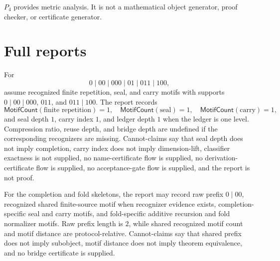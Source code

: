 \begin{corollary}
\label{cor:metric-report-p4-analysis-layer}
$P_4$ provides metric analysis. It is not a mathematical object generator, proof checker, or certificate generator.
\end{corollary}

\section{Full reports}
\label{sec:metric-report-full-reports}

\begin{example}
\label{ex:metric-report-full-completion}
For
$$
  0\mid 00\mid 000\mid 01\mid 011\mid 100,
$$
assume recognized finite repetition, seal, and carry motifs with supports $0\mid 00\mid 000$, $011$, and $011\mid 100$. The report records
$$
  \mathsf{MotifCount}(\text{finite repetition})=1,\quad
  \mathsf{MotifCount}(\text{seal})=1,\quad
  \mathsf{MotifCount}(\text{carry})=1,
$$
and seal depth $1$, carry index $1$, and ledger depth $1$ when the ledger is one level. Compression ratio, reuse depth, and bridge depth are undefined if the corresponding recognizers are missing. Cannot-claims say that seal depth does not imply completion, carry index does not imply dimension-lift, classifier exactness is not supplied, no name-certificate flow is supplied, no derivation-certificate flow is supplied, no acceptance-gate flow is supplied, and the report is not proof.
\end{example}

\begin{example}
\label{ex:metric-report-full-comparison}
For the completion and fold skeletons, the report may record raw prefix $0\mid 00$, recognized shared finite-source motif when recognizer evidence exists, completion-specific seal and carry motifs, and fold-specific additive recursion and fold normalizer motifs. Raw prefix length is $2$, while shared recognized motif count and motif distance are protocol-relative. Cannot-claims say that shared prefix does not imply subobject, motif distance does not imply theorem equivalence, and no bridge certificate is supplied.
\end{example}

